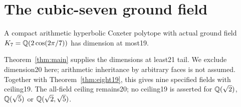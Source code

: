 \section{The cubic-seven ground field}\label{app:kseven}

\begin{theorem}\label{thm:kseven19}
A compact arithmetic hyperbolic Coxeter polytope with actual ground
field $K_7=\mathbb Q(2\cos(2\pi/7))$ has dimension at most19.
\end{theorem}
Theorem~\ref{thm:main} supplies the dimensions at least21 tail. We
exclude dimension20 here; arithmetic inheritance by arbitrary faces
is not assumed. Together with Theorem~\ref{thm:eight19}, this gives
nine specified fields with ceiling19. The all-field ceiling remains20;
no ceiling19 is asserted for $\mathbb Q(\sqrt2)$, $\mathbb Q(\sqrt5)$ or
$\mathbb Q(\sqrt2,\sqrt5)$.


